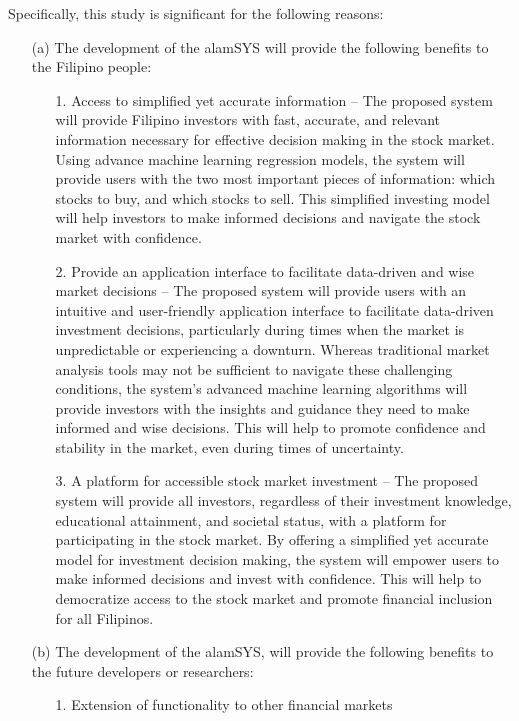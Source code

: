 Specifically, this study is significant for the following reasons:
\begin{itemize}
  \item[(a)] The development of the alamSYS will provide the 
  following benefits to the Filipino people:
  \begin{itemize}
    \item[1.]	Access to simplified yet accurate information 
    – The proposed system will provide Filipino investors with fast, 
    accurate, and relevant information necessary for effective decision making 
    in the stock market. Using advance machine learning regression models, the system 
    will provide users with the two most important pieces of information: 
    which stocks to buy, and which stocks to sell. This simplified investing 
    model will help investors to make informed decisions and navigate the stock 
    market with confidence.
    \item[2.]	Provide an application interface to facilitate data-driven 
    and wise market decisions – The proposed system will provide users with 
    an intuitive and user-friendly application interface to facilitate data-driven 
    investment decisions, particularly during times when the market is unpredictable 
    or experiencing a downturn. Whereas traditional market analysis tools may not 
    be sufficient to navigate these challenging conditions, the system's advanced 
    machine learning algorithms will provide investors with the insights and guidance 
    they need to make informed and wise decisions. This will help to promote 
    confidence and stability in the market, even during times of uncertainty.
    \item[3.]	A platform for accessible stock market investment – 
    The proposed system will provide all investors, regardless of their 
    investment knowledge, educational attainment, and societal status, 
    with a platform for participating in the stock market. By offering a 
    simplified yet accurate model for investment decision making, the 
    system will empower users to make informed decisions and invest with confidence. 
    This will help to democratize access to the stock market and promote financial 
    inclusion for all Filipinos.
  \end{itemize}
  \item[(b)] The development of the alamSYS, will provide the following benefits 
  to the future developers or researchers:
  \begin{itemize}
    \item[1.]	Extension of functionality to other financial markets 

\end{itemize}
\end{itemize}
